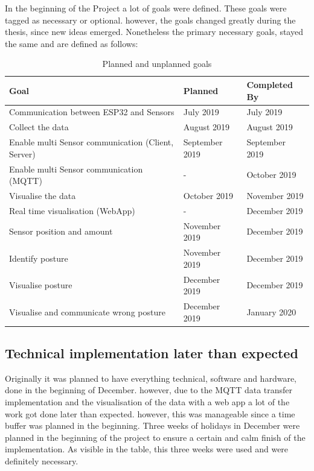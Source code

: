 In the beginning of the Project a lot of goals were defined. These goals were tagged as necessary or optional. however, the goals changed greatly during the thesis, since new ideas emerged. Nonetheless the primary necessary goals, stayed the same and are defined as follows: 
\renewcommand{\thetable}{\arabic{table}}
\begin{center}
\begin{table}[h!]
\begin{tabular}{|p{9cm}|p{3cm}|p{3cm}|}
  \hline
 \textbf{Goal} &\textbf{ Planned  } &\textbf{ Completed By } \\ 
  \hline
 Communication between ESP32 and Sensors & July 2019 & July 2019   \\  
 \hline
 Collect the data  & August 2019  & August 2019   \\  
  \hline
 Enable multi Sensor communication (Client, Server) & September 2019 & September 2019   \\ 
  \hline
 Enable multi Sensor communication (MQTT) & - & October 2019   \\ 
  \hline
 Visualise the data & October 2019 & November 2019   \\  
  \hline
 Real time visualisation (WebApp) & - & December 2019   \\  
   \hline
 Sensor position and amount & November 2019 & December 2019   \\ 
  \hline
 Identify posture & November 2019 & December 2019   \\  
  \hline
 Visualise posture & December 2019 &  December 2019 \\    
   \hline
 Visualise and communicate wrong posture & December 2019& January 2020 \\    
  \hline
\end{tabular}
\caption{Planned and unplanned goals}
\label{table:1}
\end{table}
\end{center}

\subsection{Technical implementation later than expected}

Originally it was planned to have everything technical, software and hardware, done in the beginning of December. however, due to the MQTT data transfer implementation and the visualisation of the data with a web app a lot of the work got done later than expected. however, this was manageable since a time buffer was planned in the beginning. Three weeks of holidays in December were planned in the beginning of the project to ensure a certain and calm finish of the implementation. As visible in the table, this three weeks were used and were definitely necessary. 
